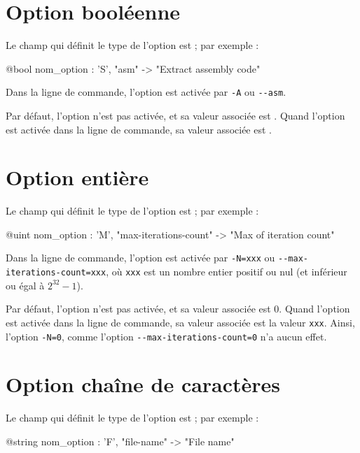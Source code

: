 \section{Option booléenne}

Le champ qui définit le type de l'option est  ; par exemple :
\begin{galgascode}
  @bool nom_option : 'S', "asm" -> "Extract assembly code"
\end{galgascode}

Dans la ligne de commande, l'option est activée par \texttt{-A} ou \texttt{-{}-asm}.

Par défaut, l'option n'est pas activée, et sa valeur associée est . Quand l'option est activée dans la ligne de commande, sa valeur associée est .








\section{Option entière}

Le champ qui définit le type de l'option est  ; par exemple :
\begin{galgascode}
  @uint nom_option : 'M', "max-iterations-count" -> "Max of iteration count"
\end{galgascode}

Dans la ligne de commande, l'option est activée par \texttt{-N=xxx} ou \texttt{-{}-max-iterations-count=xxx}, où \texttt{xxx} est un nombre entier positif ou nul (et inférieur ou égal à $2^{32}-1$).

Par défaut, l'option n'est pas activée, et sa valeur associée est $0$. Quand l'option est activée dans la ligne de commande, sa valeur associée est la valeur \texttt{xxx}. Ainsi, l'option \texttt{-N=0}, comme l'option \texttt{-{}-max-iterations-count=0} n'a aucun effet.










\section{Option chaîne de caractères}

Le champ qui définit le type de l'option est  ; par exemple :
\begin{galgascode}
  @string nom_option : 'F', "file-name" -> "File name"
\end{galgascode}

